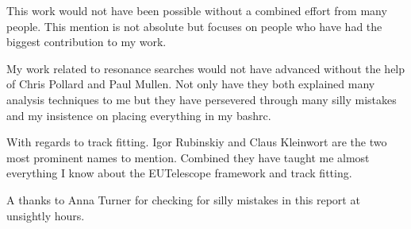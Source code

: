 This work would not have been possible without a combined effort from many people. This mention is not absolute but focuses on people who have had the biggest contribution to my work. 

My work related to resonance searches would not have advanced without the help of Chris Pollard and Paul Mullen. Not only have they both explained many analysis techniques to me but they have persevered through many silly mistakes and my insistence on placing everything in my bashrc. 

With regards to track fitting. Igor Rubinskiy and Claus Kleinwort are the two most prominent names to mention. Combined they have taught me almost everything I know about the EUTelescope framework and track fitting. 

A thanks to Anna Turner for checking for silly mistakes in this report at unsightly hours. 
